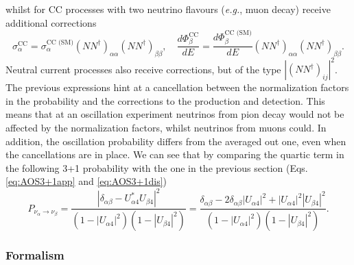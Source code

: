whilst for CC processes with two neutrino flavours (\textit{e.g.}, muon decay) receive additional corrections
\begin{equation}
 \sigma_{\alpha}^{\text{CC}} =  \sigma_{\alpha}^{\text{CC (SM)}} (NN^{\dagger})_{\alpha \alpha}(NN^{\dagger})_{\beta \beta}, \quad \frac{ d\Phi^{\text{CC}}_{\beta}}{dE} = \frac{ d\Phi^{\text{CC (SM)}}_{\beta}}{dE} (NN^{\dagger})_{\alpha \alpha} (NN^{\dagger})_{\beta \beta}.
\end{equation}
Neutral current processes also receive corrections, but of the type $|(NN^{\dagger})_{i j}|^2$. The previous expressions hint at a cancellation between the normalization factors in the probability and the corrections to the production and detection. This means that at an oscillation experiment neutrinos from pion decay would not be affected by the normalization factors, whilst neutrinos from muons could. In addition, the oscillation probability differs from the averaged out one, even when the cancellations are in place. We can see that by comparing the quartic term in the following 3+1 probability with the one in the previous section (Eqs. \ref{eq:AOS3+1app} and \ref{eq:AOS3+1dis})
\begin{equation}
 P_{\nu_{\alpha} \to \nu_{\beta}} = \frac{\left| \delta_{\alpha \beta} - U_{\alpha 4}^*U_{\beta 4} \right|^2}{(1-|U_{\alpha 4}|^2)(1-|U_{\beta 4}|^2)} %
 = \frac{ \delta_{\alpha \beta} - 2 \delta_{\alpha \beta} |U_{\alpha 4}|^2 + |U_{\alpha 4}|^2 |U_{\beta 4}|^2}{(1-|U_{\alpha 4}|^2)(1-|U_{\beta 4}|^2)}.
\end{equation}


\subsubsection{Formalism}


